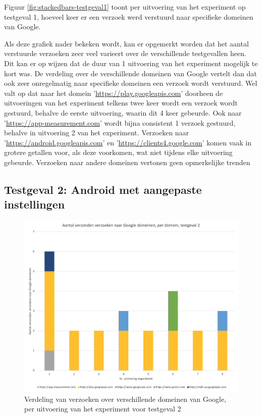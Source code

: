 Figuur \ref{fig:stackedbars-testgeval1} toont per uitvoering van het experiment op testgeval 1, hoeveel keer er een verzoek werd verstuurd naar specifieke domeinen van Google.

Als deze grafiek nader bekeken wordt, kan er opgemerkt worden dat het aantal verstuurde verzoeken zeer veel varieert over de verschillende testgevallen heen. Dit kan er op wijzen dat de duur van 1 uitvoering van het experiment mogelijk te kort was. De verdeling over de verschillende domeinen van Google vertelt dan dat ook zeer onregelmatig naar specifieke domeinen een verzoek wordt verstuurd. Wel valt op dat naar het domein '\url{https://play.googleapis.com}' doorheen de uitvoeringen van het experiment telkens twee keer wordt een verzoek wordt gestuurd, behalve de eerste uitvoering, waarin dit 4 keer gebeurde. Ook naar '\url{https://app-measurement.com}' wordt bijna consistent 1 verzoek gestuurd, behalve in uitvoering 2 van het experiment. Verzoeken naar '\url{https://android.googleapis.com}' en '\url{https://clients4.google.com}' komen vaak in grotere getallen voor, als deze voorkomen, wat niet tijdens elke uitvoering gebeurde. Verzoeken naar andere domeinen vertonen geen opmerkelijke trenden

\subsection{Testgeval 2: Android met aangepaste instellingen}

\begin{figure}
    \centering
    \includegraphics[width=1\textwidth]{experiment/grafieken/stackedbars-testgeval2.png}
    \caption{Verdeling van verzoeken over verschillende domeinen van Google, per uitvoering van het experiment voor testgeval 2}
    \label{fig:stackedbars-testgeval2}
\end{figure}

